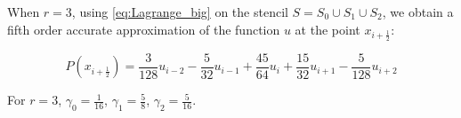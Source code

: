 When $r=3$, using \eqref{eq:Lagrange_big} on the stencil $S= S_0 \cup S_1 \cup S_2$, we obtain a fifth order accurate approximation of the function $u$ at the point $x_{i+\frac{1}{2}}$:

\begin{equation}
  \label{eq:pol_union}
  P(x_{i+\frac{1}{2}}) = \frac{3}{128} u_{i-2} - \frac{5}{32} u_{i-1} + \frac{45}{64} u_i + \frac{15}{32} u_{i+1} - \frac{5}{128} u_{i+2}
\end{equation}

For $r=3$, $\gamma_0 = \frac{1}{16}$, $\gamma_1 = \frac{5}{8}$, $\gamma_2 = \frac{5}{16}$.
